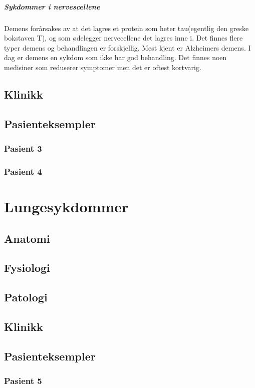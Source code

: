 \documentclass[a4paper,12pt,twoside]{memoir}
\begin{document}
			\paragraph{Sykdommer i nervescellene\\}
				Demens forårsakes av at det lagres et protein som heter tau(egentlig den greske bokstaven T), og som ødelegger nervecellene det lagres inne i. Det finnes flere typer demens og behandlingen er forskjellig. Mest kjent er Alzheimers demens. I dag er demens en sykdom som ikke har god behandling. Det finnes noen medisiner som reduserer symptomer men det er oftest kortvarig. 
		\section{Klinikk}
		\section{Pasienteksempler}
			\subsection{Pasient 3}
			\subsection{Pasient 4}
	\chapter{Lungesykdommer}
		\section{Anatomi}
		\section{Fysiologi}
		\section{Patologi}
		\section{Klinikk}
		\section{Pasienteksempler}
			\subsection{Pasient 5}
\end{document}

